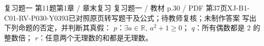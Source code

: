 \par\noindent\begin{minipage}{\linewidth}
\begin{bankitem}{复习题一 第11题}{第1章 / 章末复习 复习题一 / 教材 p.30 / PDF 第37页}{XJ-B1-C01-RV-P030-Y0393}{已对照原页转写题干及公式；待教师复核；未制作答案}
写出下列命题的否定，并判断其真假：
$p$：$\exists a\in\mathbb R,\ a^2+1\ge0$；
$q$：所有偶数都是 2 的整数倍；
$r$：任意两个无理数的和都是无理数。
\end{bankitem}
\end{minipage}\par\medskip
